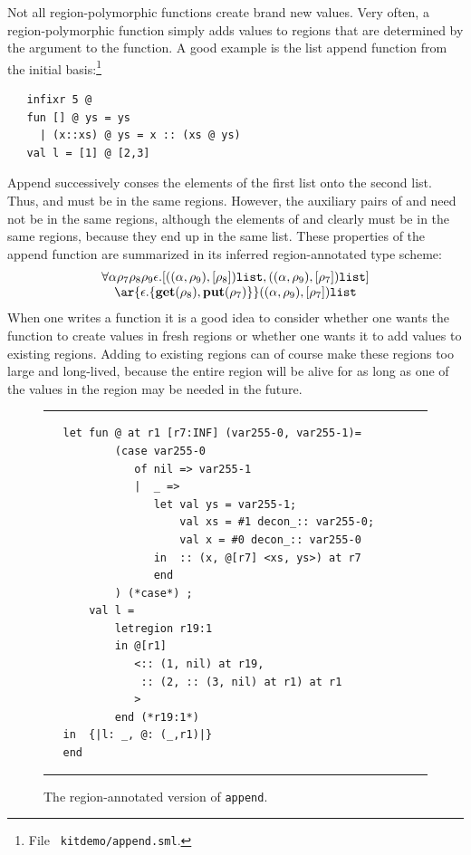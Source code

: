 \documentclass[12pt]{book}
\begin{document}
Not all region-polymorphic functions create brand new values. Very
often, a region-polymorphic function simply adds values to regions
that are determined by the argument to the function. A good example is
the list append function from the initial basis:\footnote{File {\tt
    kitdemo/append.sml}.}
\begin{verbatim}
   infixr 5 @
   fun [] @ ys = ys
     | (x::xs) @ ys = x :: (xs @ ys)
   val l = [1] @ [2,3]
\end{verbatim}
Append successively conses the elements of the first list onto the
second list.  Thus,  and  must be in the same
regions. However, the auxiliary pairs of  and 
need not be in the same regions, although the elements of 
and  clearly must be in the same regions, because they end
up in the same list. These properties of the append function 
are summarized in its inferred region-annotated type scheme:
$$\begin{array}{c}\forall\alpha\rho_7\rho_8\rho_9\epsilon.
   [ ((\alpha,\rho_9),[\rho_8])\boxml{list},
      ((\alpha,\rho_9),[\rho_7])\boxml{list} ] \\
\ar{\epsilon.\{\Get(\rho_8),\Put(\rho_7)\}} ((\alpha,\rho_9),[\rho_7])\boxml{list}\end{array}
$$
When one writes a function it is a good idea to consider whether one
wants the function to create values in fresh regions or whether one
wants it to add values to existing regions.  Adding to existing
regions can of course make these regions too large and long-lived,
because the entire region will be alive for as long as one of the
values in the region may be needed in the future. 

\begin{figure}
\hrule
\medskip
\begin{verbatim}
   let fun @ at r1 [r7:INF] (var255-0, var255-1)= 
           (case var255-0 
              of nil => var255-1
              |  _ => 
                 let val ys = var255-1; 
                     val xs = #1 decon_:: var255-0; 
                     val x = #0 decon_:: var255-0
                 in  :: (x, @[r7] <xs, ys>) at r7
                 end 
           ) (*case*) ; 
       val l = 
           letregion r19:1 
           in @[r1] 
              <:: (1, nil) at r19, 
               :: (2, :: (3, nil) at r1) at r1
              > 
           end (*r19:1*)
   in  {|l: _, @: (_,r1)|}
   end 
\end{verbatim}
\caption{The region-annotated version of {\tt append}.}  
\medskip
\hrule
\label{append.fig}
\end{figure}
\end{document}
